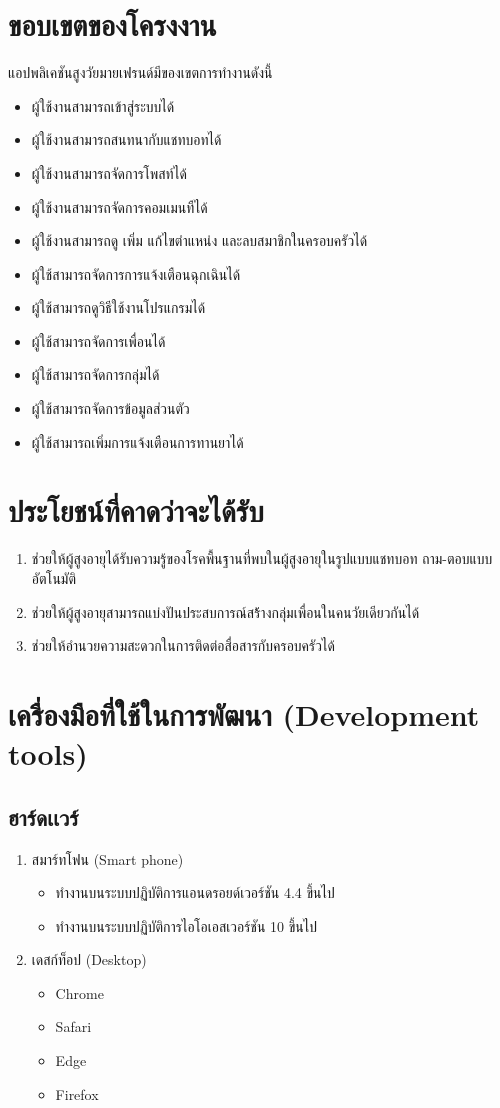\section{ขอบเขตของโครงงาน}
แอปพลิเคชันสูงวัยมายเฟรนด์มีของเขตการทำงานดังนี้
\begin{itemize}
		\item ผู้ใช้งานสามารถเข้าสู่ระบบได้
		\item ผู้ใช้งานสามารถสนทนากับแชทบอทได้
		\item ผู้ใช้งานสามารถจัดการโพสท์ได้
		\item ผู้ใช้งานสามารถจัดการคอมเมนทืได้
		\item ผู้ใช้งานสามารถดู เพิ่ม แก้ไขตำแหน่ง และลบสมาชิกในครอบครัวได้
		\item ผู้ใช้สามารถจัดการการแจ้งเตือนฉุกเฉินได้
		\item ผู้ใช้สามารถดูวิธีใช้งานโปรแกรมได้
		\item ผู้ใช้สามารถจัดการเพื่อนได้
		\item ผู้ใช้สามารถจัดการกลุ่มได้
		\item ผู้ใช้สามารถจัดการข้อมูลส่วนตัว
		\item ผู้ใช้สามารถเพิ่มการแจ้งเตือนการทานยาได้
\end{itemize}
\section{ประโยชน์ที่คาดว่าจะได้รับ}
\begin{enumerate}[label=\arabic*]
	\item ช่วยให้ผู้สูงอายุได้รับความรู้ของโรคพื้นฐานที่พบในผู้สูงอายุในรูปแบบแชทบอท ถาม-ตอบแบบอัตโนมัติ
	\item ช่วยให้ผู้สูงอายุสามารถแบ่งปันประสบการณ์สร้้างกลุ่มเพื่อนในคนวัยเดียวกันได้
	\item ช่วยให้อำนวยความสะดวกในการติดต่อสื่อสารกับครอบครัวได้
\end{enumerate}
\section{เครื่องมือที่ใช้ในการพัฒนา (Development tools)}
\subsection{ฮาร์ดเเวร์}
\begin{enumerate}
	\item สมาร์ทโฟน (Smart phone)
		\begin{itemize}
			\item ทำงานบนระบบปฏิบัติการแอนดรอยด์เวอร์ชัน 4.4 ขึ้นไป
			\item ทำงานบนระบบปฏิบัติการไอโอเอสเวอร์ชัน 10 ขึ้นไป
		\end{itemize}
		\item เดสก์ท็อป (Desktop)
		\begin{itemize}
			\item Chrome
			\item Safari
			\item Edge
			\item Firefox
		\end{itemize}
\end{enumerate}

